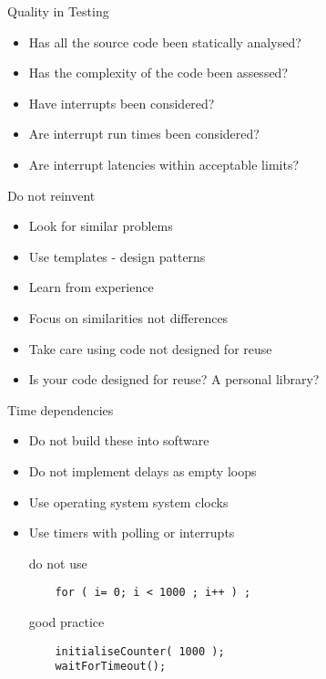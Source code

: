 \documentclass{beamer}
\begin{document}
\begin{frame}{Quality in Testing}
  \begin{itemize}

  \item Has all the source code been statically analysed?
  \item Has the complexity of the code been assessed?
  \item Have interrupts been considered?
  \item Are interrupt run times been considered?
  \item Are interrupt latencies within acceptable limits?
  \end{itemize}
\end{frame}

\begin{frame}{Do not reinvent}
  \begin{itemize}
  \item Look for similar problems
  \item Use templates - design patterns
  \item Learn from experience
  \item Focus on similarities not differences
  \item Take care using code not designed for reuse
  \item Is your code designed for reuse?  A personal library?
  \end{itemize}
\end{frame}

\begin{frame}[fragile]{Time dependencies}
\begin{itemize}
\item Do not build these into software
\item Do not implement delays as empty loops
\item Use operating system system clocks
\item Use timers with polling or interrupts
  \begin{alertblock}{do not use}
\begin{verbatim}
    for ( i= 0; i < 1000 ; i++ ) ;
\end{verbatim}
  \end{alertblock}
  \begin{exampleblock}{good practice}
\begin{verbatim}
    initialiseCounter( 1000 );
    waitForTimeout();
\end{verbatim}
  \end{exampleblock}
\end{itemize}
\end{frame}
\end{document}
